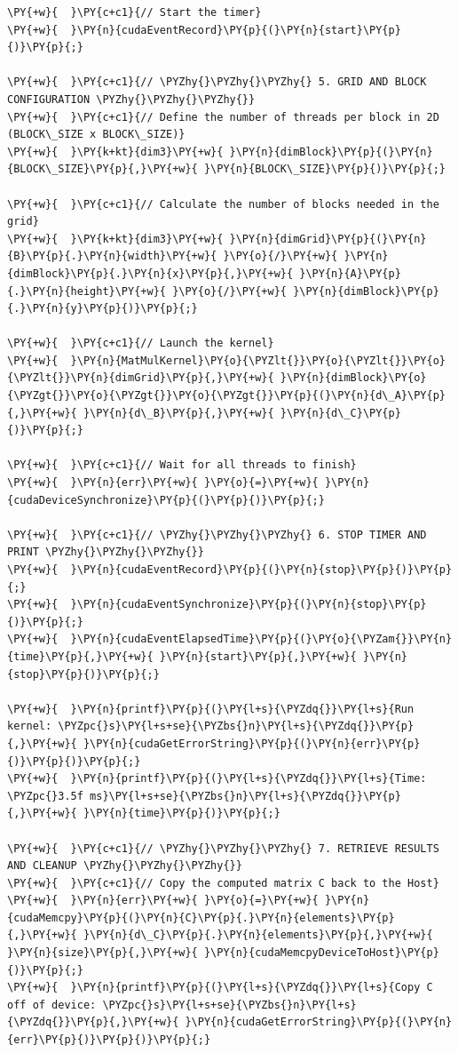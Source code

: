 \begin{Verbatim}[label=\makebox{\url{https://github.com/lucabaldini/cmepda/tree/master/slides/latex/snippets/MatrixMultiplication_shared.cu}},commandchars=\\\{\}]
\PY{+w}{  }\PY{c+c1}{// Start the timer}
\PY{+w}{  }\PY{n}{cudaEventRecord}\PY{p}{(}\PY{n}{start}\PY{p}{)}\PY{p}{;}

\PY{+w}{  }\PY{c+c1}{// \PYZhy{}\PYZhy{}\PYZhy{} 5. GRID AND BLOCK CONFIGURATION \PYZhy{}\PYZhy{}\PYZhy{}}
\PY{+w}{  }\PY{c+c1}{// Define the number of threads per block in 2D (BLOCK\_SIZE x BLOCK\_SIZE)}
\PY{+w}{  }\PY{k+kt}{dim3}\PY{+w}{ }\PY{n}{dimBlock}\PY{p}{(}\PY{n}{BLOCK\_SIZE}\PY{p}{,}\PY{+w}{ }\PY{n}{BLOCK\_SIZE}\PY{p}{)}\PY{p}{;}

\PY{+w}{  }\PY{c+c1}{// Calculate the number of blocks needed in the grid}
\PY{+w}{  }\PY{k+kt}{dim3}\PY{+w}{ }\PY{n}{dimGrid}\PY{p}{(}\PY{n}{B}\PY{p}{.}\PY{n}{width}\PY{+w}{ }\PY{o}{/}\PY{+w}{ }\PY{n}{dimBlock}\PY{p}{.}\PY{n}{x}\PY{p}{,}\PY{+w}{ }\PY{n}{A}\PY{p}{.}\PY{n}{height}\PY{+w}{ }\PY{o}{/}\PY{+w}{ }\PY{n}{dimBlock}\PY{p}{.}\PY{n}{y}\PY{p}{)}\PY{p}{;}

\PY{+w}{  }\PY{c+c1}{// Launch the kernel}
\PY{+w}{  }\PY{n}{MatMulKernel}\PY{o}{\PYZlt{}}\PY{o}{\PYZlt{}}\PY{o}{\PYZlt{}}\PY{n}{dimGrid}\PY{p}{,}\PY{+w}{ }\PY{n}{dimBlock}\PY{o}{\PYZgt{}}\PY{o}{\PYZgt{}}\PY{o}{\PYZgt{}}\PY{p}{(}\PY{n}{d\_A}\PY{p}{,}\PY{+w}{ }\PY{n}{d\_B}\PY{p}{,}\PY{+w}{ }\PY{n}{d\_C}\PY{p}{)}\PY{p}{;}

\PY{+w}{  }\PY{c+c1}{// Wait for all threads to finish}
\PY{+w}{  }\PY{n}{err}\PY{+w}{ }\PY{o}{=}\PY{+w}{ }\PY{n}{cudaDeviceSynchronize}\PY{p}{(}\PY{p}{)}\PY{p}{;}

\PY{+w}{  }\PY{c+c1}{// \PYZhy{}\PYZhy{}\PYZhy{} 6. STOP TIMER AND PRINT \PYZhy{}\PYZhy{}\PYZhy{}}
\PY{+w}{  }\PY{n}{cudaEventRecord}\PY{p}{(}\PY{n}{stop}\PY{p}{)}\PY{p}{;}
\PY{+w}{  }\PY{n}{cudaEventSynchronize}\PY{p}{(}\PY{n}{stop}\PY{p}{)}\PY{p}{;}
\PY{+w}{  }\PY{n}{cudaEventElapsedTime}\PY{p}{(}\PY{o}{\PYZam{}}\PY{n}{time}\PY{p}{,}\PY{+w}{ }\PY{n}{start}\PY{p}{,}\PY{+w}{ }\PY{n}{stop}\PY{p}{)}\PY{p}{;}

\PY{+w}{  }\PY{n}{printf}\PY{p}{(}\PY{l+s}{\PYZdq{}}\PY{l+s}{Run kernel: \PYZpc{}s}\PY{l+s+se}{\PYZbs{}n}\PY{l+s}{\PYZdq{}}\PY{p}{,}\PY{+w}{ }\PY{n}{cudaGetErrorString}\PY{p}{(}\PY{n}{err}\PY{p}{)}\PY{p}{)}\PY{p}{;}
\PY{+w}{  }\PY{n}{printf}\PY{p}{(}\PY{l+s}{\PYZdq{}}\PY{l+s}{Time: \PYZpc{}3.5f ms}\PY{l+s+se}{\PYZbs{}n}\PY{l+s}{\PYZdq{}}\PY{p}{,}\PY{+w}{ }\PY{n}{time}\PY{p}{)}\PY{p}{;}

\PY{+w}{  }\PY{c+c1}{// \PYZhy{}\PYZhy{}\PYZhy{} 7. RETRIEVE RESULTS AND CLEANUP \PYZhy{}\PYZhy{}\PYZhy{}}
\PY{+w}{  }\PY{c+c1}{// Copy the computed matrix C back to the Host}
\PY{+w}{  }\PY{n}{err}\PY{+w}{ }\PY{o}{=}\PY{+w}{ }\PY{n}{cudaMemcpy}\PY{p}{(}\PY{n}{C}\PY{p}{.}\PY{n}{elements}\PY{p}{,}\PY{+w}{ }\PY{n}{d\_C}\PY{p}{.}\PY{n}{elements}\PY{p}{,}\PY{+w}{ }\PY{n}{size}\PY{p}{,}\PY{+w}{ }\PY{n}{cudaMemcpyDeviceToHost}\PY{p}{)}\PY{p}{;}
\PY{+w}{  }\PY{n}{printf}\PY{p}{(}\PY{l+s}{\PYZdq{}}\PY{l+s}{Copy C off of device: \PYZpc{}s}\PY{l+s+se}{\PYZbs{}n}\PY{l+s}{\PYZdq{}}\PY{p}{,}\PY{+w}{ }\PY{n}{cudaGetErrorString}\PY{p}{(}\PY{n}{err}\PY{p}{)}\PY{p}{)}\PY{p}{;}


\end{Verbatim}
